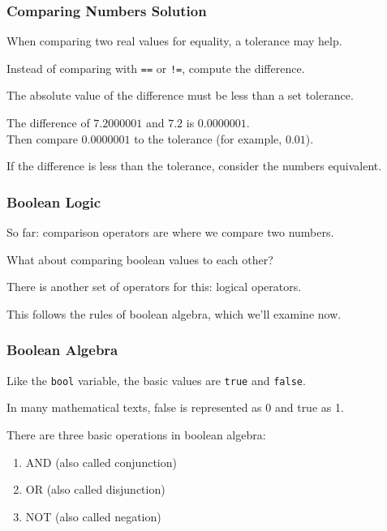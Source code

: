 \begin{frame}
\frametitle{Comparing Numbers Solution}

When comparing two real values for equality, a \alert{tolerance} may help.

Instead of comparing with \texttt{==} or \texttt{!=}, compute the difference.

The absolute value of the difference must be less than a set tolerance.

The difference of $7.2000001$ and $7.2$ is $0.0000001$.\\
\quad Then compare $0.0000001$ to the tolerance (for example, $0.01$).

If the difference is less than the tolerance, consider the numbers equivalent.

\end{frame}

\begin{frame}
\frametitle{Boolean Logic}
So far: comparison operators are where we compare two numbers.

What about comparing boolean values to each other?

There is another set of operators for this: \alert{logical operators}.

This follows the rules of \alert{boolean algebra}, which we'll examine now.

\end{frame}


\begin{frame}
\frametitle{Boolean Algebra}
Like the \texttt{bool} variable, the basic values are \texttt{true} and \texttt{false}.

In many mathematical texts, false is represented as 0 and true as 1.

There are three basic operations in boolean algebra:

\begin{enumerate}
	\item \alert{AND} (also called conjunction)
	\item \alert{OR} (also called disjunction)
	\item \alert{NOT} (also called negation)
\end{enumerate}

\end{frame}

